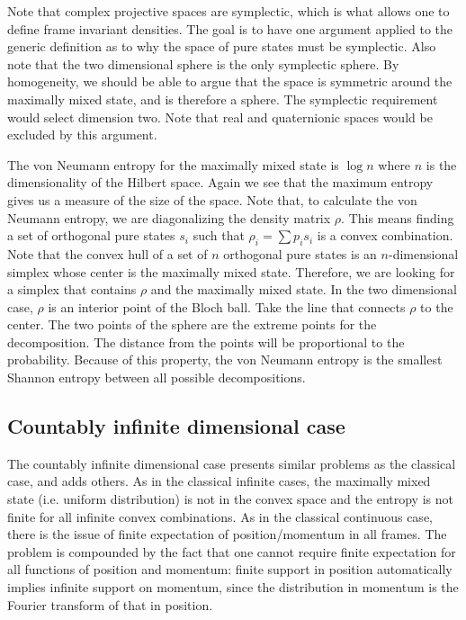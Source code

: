 Note that complex projective spaces are symplectic, which is what allows one to define frame invariant densities. The goal is to have one argument applied to the generic definition as to why the space of pure states must be symplectic. Also note that the two dimensional sphere is the only symplectic sphere. By homogeneity, we should be able to argue that the space is symmetric around the maximally mixed state, and is therefore a sphere. The symplectic requirement would select dimension two. Note that real and quaternionic spaces would be excluded by this argument.

The von Neumann entropy for the maximally mixed state is $\log n$ where $n$ is the dimensionality of the Hilbert space. Again we see that the maximum entropy gives us a measure of the size of the space. Note that, to calculate the von Neumann entropy, we are diagonalizing the density matrix $\rho$. This means finding a set of orthogonal pure states $s_i$ such that $\rho_i = \sum p_i s_i$ is a convex combination. Note that the convex hull of a set of $n$ orthogonal pure states is an $n$-dimensional simplex whose center is the maximally mixed state. Therefore, we are looking for a simplex that contains $\rho$ and the maximally mixed state. In the two dimensional case, $\rho$ is an interior point of the Bloch ball. Take the line that connects $\rho$ to the center. The two points of the sphere are the extreme points for the decomposition. The distance from the points will be proportional to the probability. Because of this property, the von Neumann entropy is the smallest Shannon entropy between all possible decompositions.


\subsection{Countably infinite dimensional case}

The countably infinite dimensional case presents similar problems as the classical case, and adds others. As in the classical infinite cases, the maximally mixed state (i.e. uniform distribution) is not in the convex space and the entropy is not finite for all infinite convex combinations. As in the classical continuous case, there is the issue of finite expectation of position/momentum in all frames. The problem is compounded by the fact that one cannot require finite expectation for all functions of position and momentum: finite support in position automatically implies infinite support on momentum, since the distribution in momentum is the Fourier transform of that in position.


